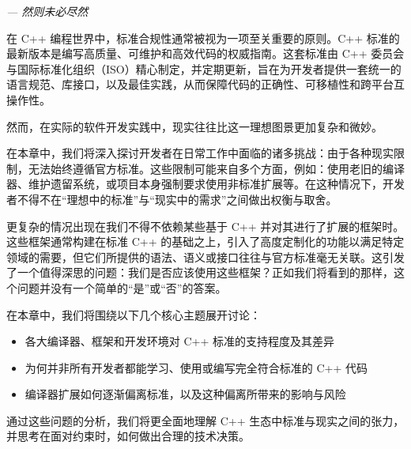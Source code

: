 
\begin{flushright}
\textit{--- 然则未必尽然}
\end{flushright}

在 C++ 编程世界中，标准合规性通常被视为一项至关重要的原则。C++ 标准的最新版本是编写高质量、可维护和高效代码的权威指南。这套标准由 C++ 委员会与国际标准化组织（ISO）精心制定，并定期更新，旨在为开发者提供一套统一的语言规范、库接口，以及最佳实践，从而保障代码的正确性、可移植性和跨平台互操作性。

然而，在实际的软件开发实践中，现实往往比这一理想图景更加复杂和微妙。

在本章中，我们将深入探讨开发者在日常工作中面临的诸多挑战：由于各种现实限制，无法始终遵循官方标准。这些限制可能来自多个方面，例如：使用老旧的编译器、维护遗留系统，或项目本身强制要求使用非标准扩展等。在这种情况下，开发者不得不在“理想中的标准”与“现实中的需求”之间做出权衡与取舍。

更复杂的情况出现在我们不得不依赖某些基于 C++ 并对其进行了扩展的框架时。这些框架通常构建在标准 C++ 的基础之上，引入了高度定制化的功能以满足特定领域的需要，但它们所提供的语法、语义或接口往往与官方标准毫无关联。这引发了一个值得深思的问题：我们是否应该使用这些框架？正如我们将看到的那样，这个问题并没有一个简单的“是”或“否”的答案。

在本章中，我们将围绕以下几个核心主题展开讨论：

\begin{itemize}
\item 
各大编译器、框架和开发环境对 C++ 标准的支持程度及其差异

\item 
为何并非所有开发者都能学习、使用或编写完全符合标准的 C++ 代码

\item 
编译器扩展如何逐渐偏离标准，以及这种偏离所带来的影响与风险
\end{itemize}

通过这些问题的分析，我们将更全面地理解 C++ 生态中标准与现实之间的张力，并思考在面对约束时，如何做出合理的技术决策。